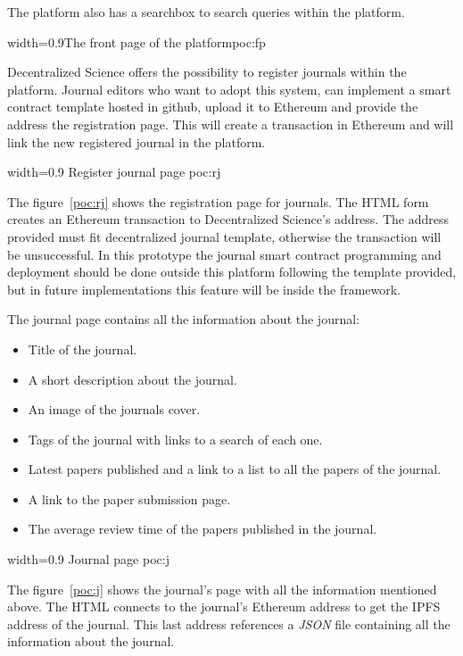 The platform also has a searchbox to search queries within the platform.

 {width=0.9\linewidth}{The front page of the
  platform}{poc:fp}


Decentralized Science offers the possibility to register journals within the
platform. Journal editors who want to adopt this system, can implement a smart
contract template hosted in github, upload it to Ethereum and provide the
address the registration page. This will create a transaction in Ethereum and
will link the new registered journal in the platform.

%
{width=0.9\linewidth}%
{Register journal page}%
{poc:rj}

The figure~\ref{poc:rj} shows the registration page for journals. The HTML form
creates an Ethereum transaction to Decentralized Science's address. The address
provided must fit decentralized journal template, otherwise the transaction will
be unsuccessful. In this prototype the journal smart contract programming and
deployment should be done outside this platform following the template provided,
but in future implementations this feature will be inside the framework.


The journal page contains all the information about the journal:
\begin{itemize}
\item Title of the journal.
\item A short description about the journal.
\item An image of the journals cover.
\item Tags of the journal with links to a search of each one.
\item Latest papers published and a link to a list to all the papers of the
  journal.
\item A link to the paper submission page.
\item The average review time of the papers published in the journal.
\end{itemize}

%
{width=0.9\linewidth}%
{Journal page}%
{poc:j}

The figure~\ref{poc:j} shows the journal's page with all the information
mentioned above. The HTML connects to the journal's Ethereum address to get the
IPFS address of the journal. This last address references a \emph{JSON} file
containing all the information about the journal.


